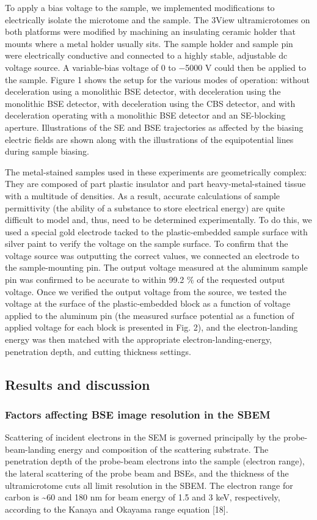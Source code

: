 \documentclass{article}
\begin{document}
To apply a bias voltage to the sample, we implemented modifications to electrically isolate the microtome and the sample. The 3View ultramicrotomes on both platforms were modified by machining an insulating ceramic holder that mounts where a metal holder usually sits. The sample holder and sample pin were electrically conductive and connected to a highly stable, adjustable dc voltage source. A variable-bias voltage of 0 to −5000 V could then be applied to the sample. Figure 1 shows the setup for the various modes of operation: without deceleration using a monolithic BSE detector, with deceleration using the monolithic BSE detector, with deceleration using the CBS detector, and with deceleration operating with a monolithic BSE detector and an SE-blocking aperture. Illustrations of the SE and BSE trajectories as affected by the biasing electric fields are shown along with the illustrations of the equipotential lines during sample biasing.

The metal-stained samples used in these experiments are geometrically complex: They are composed of part plastic insulator and part heavy-metal-stained tissue with a multitude of densities. As a result, accurate calculations of sample permittivity (the ability of a substance to store electrical energy) are quite difficult to model and, thus, need to be determined experimentally. To do this, we used a special gold electrode tacked to the plastic-embedded sample surface with silver paint to verify the voltage on the sample surface. To confirm that the voltage source was outputting the correct values, we connected an electrode to the sample-mounting pin. The output voltage measured at the aluminum sample pin was confirmed to be accurate to within 99.2 \% of the requested output voltage. Once we verified the output voltage from the source, we tested the voltage at the surface of the plastic-embedded block as a function of voltage applied to the aluminum pin (the measured surface potential as a function of applied voltage for each block is presented in Fig. 2), and the electron-landing energy was then matched with the appropriate electron-landing-energy, penetration depth, and cutting thickness settings.

\subsection*{Results and discussion}
\subsubsection*{Factors affecting BSE image resolution in the SBEM}
Scattering of incident electrons in the SEM is governed principally by the probe-beam-landing energy and composition of the scattering substrate. The penetration depth of the probe-beam electrons into the sample (electron range), the lateral scattering of the probe beam and BSEs, and the thickness of the ultramicrotome cuts all limit resolution in the SBEM. The electron range for carbon is \textasciitilde{}60 and 180 nm for beam energy of 1.5 and 3 keV, respectively, according to the Kanaya and Okayama range equation [18].
\end{document}
